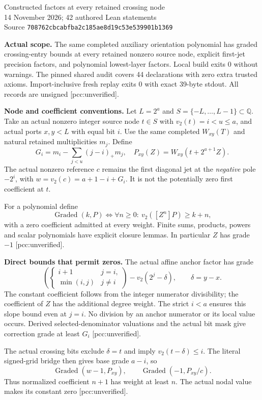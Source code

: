 \documentclass[10pt]{article}
\begin{document}
\begin{center}
{\Large Constructed factors at every retained crossing node}\\[4pt]
14 November 2026; 42 authored Lean statements\\
Source \texttt{708762cbcabfba2c185ae8d19c53e539901b1369}
\end{center}
\textbf{Actual scope.} The same completed auxiliary orientation polynomial
has graded crossing-entry bounds at every retained nonzero source node,
explicit first-jet precision factors, and polynomial lowest-layer factors.
Local build exits 0 without warnings. The pinned shared audit covers 44 declarations with zero extra trusted
axioms. Import-inclusive fresh replay exits 0 with exact 39-byte stdout. All records are unsigned
[pcc:unverified].

\textbf{Node and coefficient conventions.} Let $L=2^a$ and
$S=\{-L,\ldots,L-1\}\subset\mathbb Q$. Take an actual nonzero integer
source node $t\in S$ with $v_2(t)=i<u\le a$, and actual ports $x,y<L$
with equal bit $i$. Use the same completed $W_{xy}(T)$ and natural retained
multiplicities $m_j$. Define
\[
 G_i=m_i-\sum_{j<u}(j-i)_+m_j,\quad
 P_{xy}(Z)=W_{xy}(t+2^{a+1}Z).
\]
The actual nonzero reference $c$ remains the first diagonal jet at the
\emph{negative} pole $-2^i$, with $w=v_2(c)=a+1-i+G_i$.
It is not the potentially zero first coefficient at $t$.

For a polynomial define
\[
 \operatorname{Graded}(k,P)\iff
 \forall n\ge0:\ v_2([Z^n]P)\ge k+n,
\]
with a zero coefficient admitted at every weight. Finite sums, products,
powers and scalar polynomials have explicit closure lemmas. In particular
$Z$ has grade $-1$ [pcc:unverified].

\textbf{Direct bounds that permit zeros.} The actual affine anchor factor
has grade
\[
 \left(\begin{cases}i+1&j=i,\\\min(i,j)&j\ne i\end{cases}\right)
 -v_2(2^j-\delta),\qquad\delta=y-x.
\]
The constant coefficient follows from the integer numerator divisibility;
the coefficient of $Z$ has the additional degree weight. The strict $i<a$
ensures this slope bound even at $j=i$. No division by an anchor numerator
or its local value occurs. Derived selected-denominator valuations and the
actual bit mask give correction grade at least $G_i$ [pcc:unverified].

The actual crossing bits exclude $\delta=t$ and imply
$v_2(t-\delta)\le i$. The literal signed-grid bridge then gives base grade
$a-i$, so
\[
 \operatorname{Graded}(w-1,P_{xy}),\qquad
 \operatorname{Graded}(-1,P_{xy}/c).
\]
Thus normalized coefficient $n+1$ has weight at least $n$. The actual nodal
value makes its constant zero [pcc:unverified].
\end{document}
